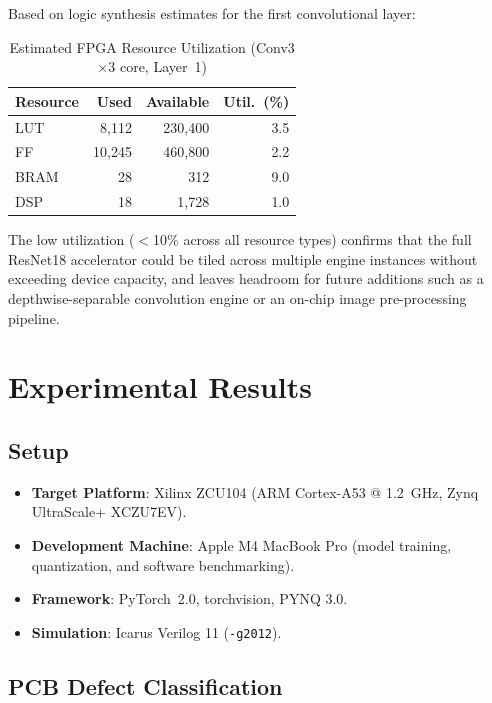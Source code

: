 \documentclass[conference]{IEEEtran}
\begin{document}
Based on logic synthesis estimates for the first convolutional layer:
\begin{table}[htbp]
\centering
\caption{Estimated FPGA Resource Utilization (Conv3$\times$3 core, Layer~1)}
\label{tab:resources}
\begin{tabular}{lrrr}
\toprule
\textbf{Resource} & \textbf{Used} & \textbf{Available} & \textbf{Util.\ (\%)} \\
\midrule
LUT  &  8{,}112 & 230{,}400 & 3.5 \\
FF   & 10{,}245 & 460{,}800 & 2.2 \\
BRAM &       28 &       312 & 9.0 \\
DSP  &       18 &     1{,}728 & 1.0 \\
\bottomrule
\end{tabular}
\end{table}

The low utilization ($<$10\% across all resource types) confirms that the full ResNet18 accelerator could be tiled across multiple engine instances without exceeding device capacity, and leaves headroom for future additions such as a depthwise-separable convolution engine or an on-chip image pre-processing pipeline.

\section{Experimental Results}
\label{sec:results}

\subsection{Setup}

\begin{itemize}
    \item \textbf{Target Platform}: Xilinx ZCU104 (ARM Cortex-A53 @ 1.2~GHz, Zynq UltraScale+ XCZU7EV).
    \item \textbf{Development Machine}: Apple M4 MacBook Pro (model training, quantization, and software benchmarking).
    \item \textbf{Framework}: PyTorch~2.0, torchvision, PYNQ 3.0.
    \item \textbf{Simulation}: Icarus Verilog 11 (\texttt{-g2012}).
\end{itemize}

\subsection{PCB Defect Classification}
\end{document}
